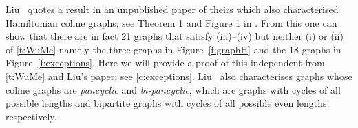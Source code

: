 \documentclass[12pt]{article}
\newtheorem{thm}{Theorem}[section]
\theoremstyle{definition}
\newcommand{\co}{\text{co}}
\begin{document}
Liu~\cite{Li05} quotes a result in an unpublished paper of theirs which also characterised Hamiltonian coline graphs; see Theorem 1 and Figure 1 in \cite{Li05}.
From this one can show that there are in fact 21 graphs that satisfy (iii)--(iv)  but neither (i) or (ii) of \cref{t:WuMe} namely the three graphs in Figure~\ref{f:graphH} and the 18 graphs in Figure~\ref{f:exceptions}. Here we will provide a proof of this independent from \cref{t:WuMe} and Liu's paper; see \cref{c:exceptions}.
Liu~\cite{Li05} also characterises graphs whose coline graphs are {\em pancyclic} and {\em bi-pancyclic}, which are graphs with cycles of all possible lengths and bipartite graphs with cycles of all possible even lengths, respectively.
\end{document}
